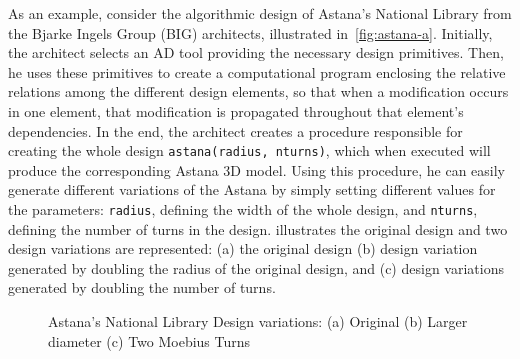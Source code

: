 	As an example, consider the algorithmic design of Astana's National Library from the Bjarke Ingels Group (BIG) architects, illustrated in~\cref{fig:astana-a}. Initially, the architect selects an \ac{AD} tool providing the necessary design primitives. Then, he uses these primitives to create a computational program enclosing the relative relations among the different design elements, so that when a modification occurs in one element, that modification is propagated throughout that element's dependencies. In the end, the architect creates a procedure responsible for creating the whole design \texttt{astana(radius, nturns)}, which when executed will produce the corresponding Astana 3D model. Using this procedure, he can easily generate different variations of the Astana by simply setting different values for the parameters: \texttt{radius}, defining the width of the whole design, and \texttt{nturns}, defining the number of turns in the design.  illustrates the original design and two design variations are represented: (a) the original design (b) design variation generated by doubling the radius of the original design, and (c) design variations generated by doubling the number of turns.
	
\begin{figure}[htbp]
\centering
{}%
\hfill
{}%
\hfill
{}%

\caption[Design variations of the Astana's National Library]{Astana's National Library Design variations: (a) Original (b) Larger diameter (c) Two Moebius Turns}
\label{fig:astana}
\end{figure}

